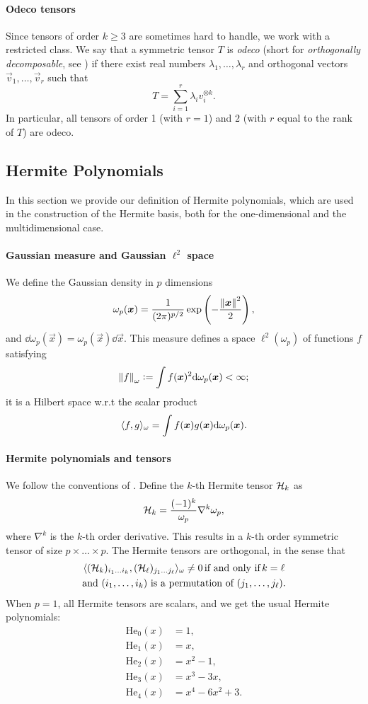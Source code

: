 \paragraph{Odeco tensors} Since tensors of order $k \geq 3$ are sometimes hard to handle, we work with a restricted class. We say that a symmetric tensor $T$ is \emph{odeco} (short for \emph{orthogonally decomposable}, see \cite{robeva2016orthogonal}) if there exist real numbers $\lambda_1, \dots, \lambda_r$ and orthogonal vectors $\vec{v}_1, \dots, \vec{v}_r$ such that
\[ T =\sum_{i=1}^r \lambda_i v_i^{\otimes k}.\]
In particular, all tensors of order 1 (with $r=1$) and 2 (with $r$ equal to the rank of $T$) are odeco.

\subsection{Hermite Polynomials} 
In this section we provide our definition of Hermite polynomials, which are used in the construction of the Hermite basis, both for the one-dimensional and the multidimensional case.

\paragraph{Gaussian measure and Gaussian $\ell^2$ space} We define the Gaussian density in $p$ dimensions
\[ \omega_p({\boldsymbol{x}}) = \frac{1}{(2\pi)^{p/2}} \exp\left(-\frac{\left\lVert {\boldsymbol{x}}\right\rVert^2}{2}\right), \]
and $\dd\omega_p(\vec{x}) = \omega_p(\vec{x}) \dd\vec{x}$. This measure defines a space $\ell^2(\omega_p)$ of functions $f$ satisfying
\[ \left\lVert f\right\rVert_{\omega} := \int f({\boldsymbol{x}})^2 \text{d}\omega_p({\boldsymbol{x}}) < \infty; \]
it is a Hilbert space w.r.t the scalar product
\[ \langle f, g \rangle_\omega = \int f({\boldsymbol{x}})g({\boldsymbol{x}}) \text{d}\omega_p({\boldsymbol{x}}).\]

\paragraph{Hermite polynomials and tensors}

We follow the conventions of \cite{grad1949note}. Define the $k$-th Hermite tensor $\mathcal{H}_k$ as
\[ \mathcal{H}_k = \frac{(-1)^k}{\omega_p} \nabla^k \omega_p,\]
where $\nabla^k$ is the $k$-th order derivative. This results in a $k$-th order symmetric tensor of size $p \times \dots \times p$. The Hermite tensors are orthogonal, in the sense that
\begin{multline*}
  \langle (\mathcal{H}_k)_{i_1\dots i_k}, (\mathcal{H}_\ell)_{j_1\dots j_\ell} \rangle_\omega \neq 0 \, \text{if and only if} \, k=\ell \\
  \text{and } (i_1, \dots, i_k) \text{ is a permutation of } (j_1, \dots, j_\ell) .
\end{multline*}
When $p = 1$, all Hermite tensors are scalars, and we get the usual Hermite polynomials:
\begin{align}
    \mathrm{He}_0(x) &= 1, \\
    \mathrm{He}_1(x) &= x, \\
    \mathrm{He}_2(x) &= x^2 - 1, \\
    \mathrm{He}_3(x) &= x^3 - 3x, \\
    \mathrm{He}_4(x) &= x^4 - 6x^2 + 3.
\end{align}

